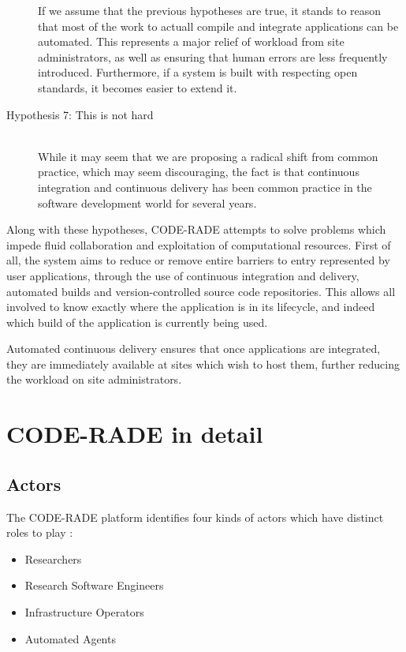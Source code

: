 \documentclass[a4paper]{jpconf}
\begin{document}
\begin{description}
    If we assume that the previous hypotheses are true, it stands to reason that most of the work to actuall compile and integrate applications can be automated. This represents a major relief of workload from site administrators, as well as ensuring that human errors are less frequently introduced. Furthermore, if a system is built with respecting open standards, it becomes easier to extend it.
  \item[Hypothesis 7: This is not hard] \hfill \\
    While it may seem that we are proposing a radical shift from common practice, which may seem discouraging, the fact is that continuous integration\cite{ContinuousIntegration} and continuous delivery\cite{ContinuousDelivery} has been common practice in the software development world for several years.
\end{description}

Along with these hypotheses, CODE-RADE attempts  to solve problems which impede fluid collaboration and exploitation of computational resources. First of all, the system aims to reduce or remove entire barriers to entry represented by user applications, through the use of continuous integration and delivery, automated builds and version-controlled source code repositories. This allows all involved to know exactly where the application is in its lifecycle, and indeed which build of the application is currently being used.

Automated continuous delivery ensures that once applications are integrated, they are immediately available at sites which wish to host them, further reducing the workload on site administrators.

\section{CODE-RADE in detail}

\subsection{Actors}

The CODE-RADE platform identifies four kinds of actors which have distinct roles to play :
\begin{itemize}
  \item Researchers
  \item Research Software Engineers
  \item Infrastructure Operators
  \item Automated Agents
\end{itemize}
\end{document}

